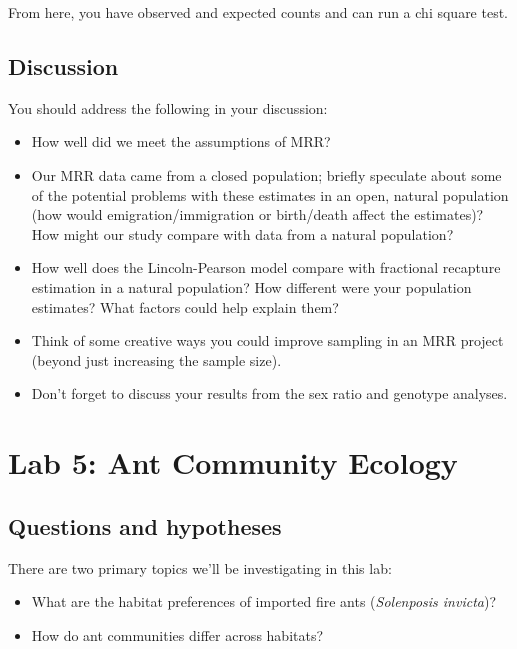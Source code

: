 \documentclass[]{book}
\providecommand{\tightlist}{%
  \setlength{\itemsep}{0pt}\setlength{\parskip}{0pt}}
\begin{document}
From here, you have observed and expected counts and can run a chi
square test.

\section{Discussion}\label{discussion-2}

You should address the following in your discussion:

\begin{itemize}
\tightlist
\item
  How well did we meet the assumptions of MRR?
\item
  Our MRR data came from a closed population; briefly speculate about
  some of the potential problems with these estimates in an open,
  natural population (how would emigration/immigration or birth/death
  affect the estimates)? How might our study compare with data from a
  natural population?
\item
  How well does the Lincoln-Pearson model compare with fractional
  recapture estimation in a natural population? How different were your
  population estimates? What factors could help explain them?
\item
  Think of some creative ways you could improve sampling in an MRR
  project (beyond just increasing the sample size).\\
\item
  Don't forget to discuss your results from the sex ratio and genotype
  analyses.
\end{itemize}

\chapter{Lab 5: Ant Community Ecology}\label{Lab5}

\section{Questions and hypotheses}\label{questions-and-hypotheses-2}

There are two primary topics we'll be investigating in this lab:

\begin{itemize}
\tightlist
\item
  What are the habitat preferences of imported fire ants
  (\emph{Solenposis invicta})?
\item
  How do ant communities differ across habitats?
\end{itemize}
\end{document}
